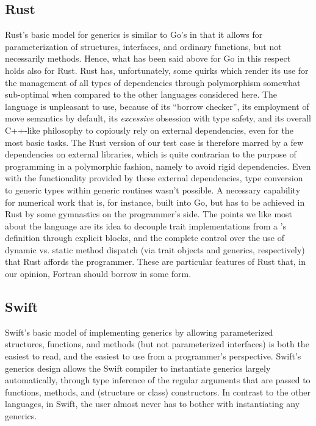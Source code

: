 \documentclass[11pt,oneside]{report}
\newcommand{\code}[1]{{\selectfont\ttfamily{#1}}}
\begin{document}
\subsection{Rust}

Rust's basic model for generics is similar to Go's in that it allows
for parameterization of structures, interfaces, and ordinary
functions, but not necessarily methods. Hence, what has been said
above for Go in this respect holds also for Rust. Rust has,
unfortunately, some quirks which render its use for the management of
all types of dependencies through polymorphism somewhat sub-optimal
when compared to the other languages considered here. The language is
unpleasant to use, because of its ``borrow checker'', its employment
of move semantics by default, its \emph{excessive} obsession with type
safety, and its overall C++-like philosophy to copiously rely on
external dependencies, even for the most basic tasks. The Rust version
of our test case is therefore marred by a few dependencies on external
libraries, which is quite contrarian to the purpose of programming in
a polymorphic fashion, namely to avoid rigid dependencies. Even with
the functionality provided by these external dependencies, type
conversion to generic types within generic routines wasn't possible.
A necessary capability for numerical work that is, for instance, built
into Go, but has to be achieved in Rust by some gymnastics on the
programmer's side. The points we like most about the language are its
idea to decouple trait implementations from a \code{struct}'s
definition through explicit \code{impl} blocks, and the complete
control over the use of dynamic vs. static method dispatch (via trait
objects and generics, respectively) that Rust affords the
programmer. These are particular features of Rust that, in our
opinion, Fortran should borrow in some form.

\subsection{Swift}

Swift's basic model of implementing generics by allowing parameterized
structures, functions, and methods (but not parameterized interfaces)
is both the easiest to read, and the easiest to use from a
programmer's perspective. Swift's generics design allows the Swift
compiler to instantiate generics largely automatically, through type
inference of the regular arguments that are passed to functions,
methods, and (structure or class) constructors. In contrast to the
other languages, in Swift, the user almost never has to bother with
instantiating any generics.
\end{document}

